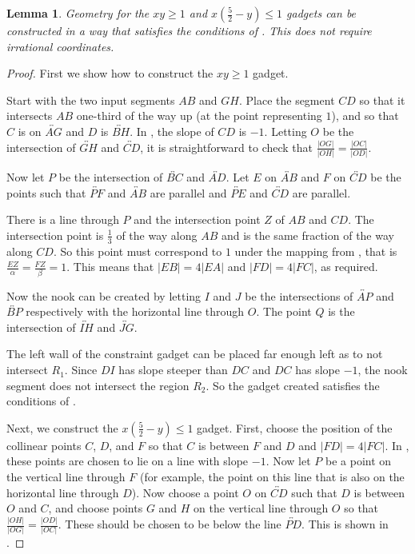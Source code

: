 \documentclass[11pt]{article}
\theoremstyle{plain}
\newtheorem{lemma}[theorem]{Lemma}
\theoremstyle{definition}
\numberwithin{theorem}{section}
\begin{document}
\begin{lemma}\label{lem:InversionConstruction}
Geometry for the $xy\ge 1$ and $x\left(\frac{5}2-y\right)\le 1$ gadgets can be constructed in a way that satisfies the conditions of . This does not require irrational coordinates.
\end{lemma}

\begin{proof}
First we show how to construct the $xy\ge 1$ gadget.

Start with the two input segments $AB$ and $GH$. Place the segment $CD$ so that it intersects $AB$ one-third of the way up (at the point representing $1$), and so that $C$ is on $\overleftrightarrow{AG}$ and $D$ is $\overleftrightarrow{BH}$. In , the slope of $CD$ is $-1$. Letting $O$ be the intersection of $\overleftrightarrow{GH}$ and $\overleftrightarrow{CD}$, it is straightforward to check that $\frac{|OG|}{|OH|}=\frac{|OC|}{|OD|}$. 

Now let $P$ be the intersection of $\overleftrightarrow{BC}$ and $\overleftrightarrow{AD}$. Let $E$ on $\overleftrightarrow{AB}$ and $F$ on $\overleftrightarrow{CD}$ be the points such that $\overleftrightarrow{PF}$ and $\overleftrightarrow{AB}$ are parallel and $\overleftrightarrow{PE}$ and $\overleftrightarrow{CD}$ are parallel. 

There is a line through $P$ and the intersection point $Z$ of $AB$ and $CD$. The intersection point is $\frac13$ of the way along $AB$ and is the same fraction of the way along $CD$. So this point must correspond to $1$ under the mapping from , that is $\frac{EZ}{\alpha}=\frac{FZ}{\beta}=1$. This means that $|EB|=4|EA|$ and $|FD|=4|FC|$, as required.

Now the nook can be created by letting $I$ and $J$ be the intersections of $\overleftrightarrow{AP}$ and $\overleftrightarrow{BP}$ respectively with the horizontal line through $O$. The point $Q$ is the intersection of $\overleftrightarrow{IH}$ and $\overleftrightarrow{JG}$. 

The left wall of the constraint gadget can be placed far enough left as to not intersect $R_1$. Since $DI$ has slope steeper than $DC$ and $DC$ has slope $-1$, the nook segment does not intersect the region $R_2$. So the gadget created satisfies the conditions of .

Next, we construct the $x\left(\frac{5}2-y\right)\le 1$ gadget. First, choose the position of the collinear points $C$, $D$, and $F$ so that $C$ is between $F$ and $D$ and $|FD|=4|FC|$. In , these points are chosen to lie on a line with slope $-1$. Now let $P$ be a point on the vertical line through $F$ (for example, the point on this line that is also on the horizontal line through $D$). Now choose a point $O$ on $\overleftrightarrow{CD}$ such that $D$ is between $O$ and $C$, and choose points $G$ and $H$ on the vertical line through $O$ so that $\frac{|OH|}{|OG|}=\frac{|OD|}{|OC|}$. These should be chosen to be below the line $\overleftrightarrow{PD}$. This is shown in .


\end{proof}
\end{document}
